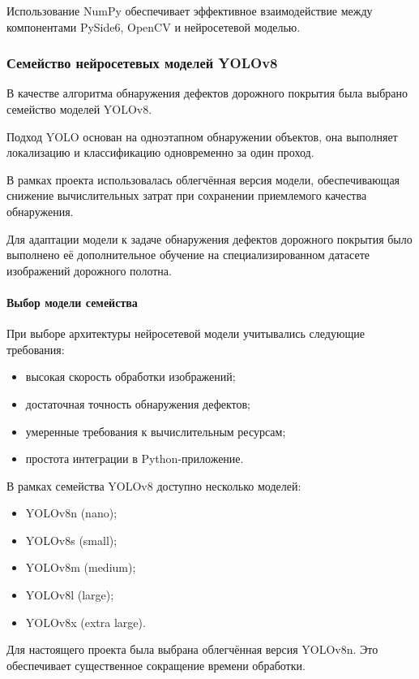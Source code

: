 Использование NumPy обеспечивает эффективное взаимодействие между компонентами PySide6, OpenCV и нейросетевой моделью.

\subsubsection{Семейство нейросетевых моделей YOLOv8}

В качестве алгоритма обнаружения дефектов дорожного покрытия была выбрано семейство моделей YOLOv8.

Подход YOLO основан на одноэтапном обнаружении объектов, она выполняет локализацию и классификацию одновременно за один проход.

В рамках проекта использовалась облегчённая версия модели, обеспечивающая снижение вычислительных затрат при сохранении приемлемого качества обнаружения.

Для адаптации модели к задаче обнаружения дефектов дорожного покрытия было выполнено её дополнительное обучение на специализированном датасете изображений дорожного полотна.

\paragraph{Выбор модели семейства}

При выборе архитектуры нейросетевой модели учитывались следующие требования:

\begin{itemize}
	\item высокая скорость обработки изображений;
	\item достаточная точность обнаружения дефектов;
	\item умеренные требования к вычислительным ресурсам;
	\item простота интеграции в Python-приложение.
\end{itemize}

В рамках семейства YOLOv8 доступно несколько моделей:

\begin{itemize}
	\item YOLOv8n (nano);
	\item YOLOv8s (small);
	\item YOLOv8m (medium);
	\item YOLOv8l (large);
	\item YOLOv8x (extra large).
\end{itemize}

Для настоящего проекта была выбрана облегчённая версия YOLOv8n. Это обеспечивает существенное сокращение времени обработки.

